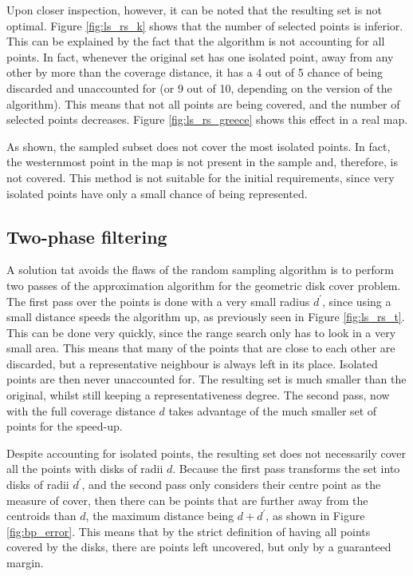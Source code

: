 



Upon closer inspection, however, it can be noted that the resulting set is not optimal. Figure \ref{fig:ls_rs_k} shows that the number of selected points is inferior.
This can be explained by the fact that the algorithm is not accounting for all points. In fact, whenever the original set has one isolated point, away from any other by more than the coverage distance, it has a 4 out of 5 chance of being discarded and unaccounted for (or 9 out of 10, depending on the version of the algorithm). This means that not all points are being covered, and the number of selected points decreases. Figure \ref{fig:ls_rs_greece} shows this effect in a real map.



As shown, the sampled subset does not cover the most isolated points. In fact, the westernmost point in the map is not present in the sample and, therefore, is not covered. This method is not suitable for the initial requirements, since very isolated points have only a small chance of being represented.

\subsection{Two-phase filtering}

A solution tat avoids the flaws of the random sampling algorithm is to perform two passes of the approximation algorithm for the geometric disk cover problem. The first pass over the points is done with a very small radius $d^\prime$, since using a small distance speeds the algorithm up, as previously seen in Figure \ref{fig:ls_rs_t}. This can be done very quickly, since the range search only has to look in a very small area. This means that many of the points that are close to each other are discarded, but a representative neighbour is always left in its place. Isolated points are then never unaccounted for. The resulting set is much smaller than the original, whilst still keeping a representativeness degree. The second pass, now with the full coverage distance $d$ takes advantage of the much smaller set of points for the speed-up. 

Despite accounting for isolated points, the resulting set does not necessarily cover all the points with disks of radii $d$. Because the first pass transforms the set into disks of radii $d^\prime$, and the second pass only considers their centre point as the measure of cover, then there can be points that are further away from the centroids than $d$, the maximum distance being $d+d^\prime$, as shown in Figure \ref{fig:bp_error}. This means that by the strict definition of having all points covered by the disks, there are points left uncovered, but only by a guaranteed margin.

